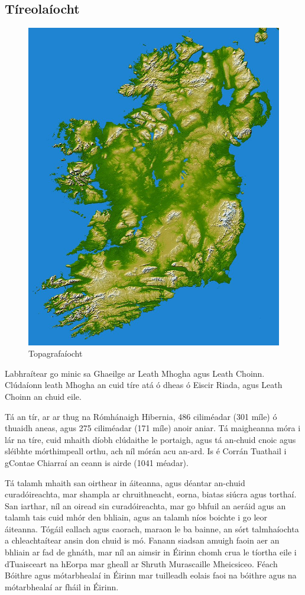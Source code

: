 \documentclass[a4paper,12pt]{article}
\theoremstyle{plain} %
\theoremstyle{definition} %
\theoremstyle{remark} %
\begin{document}
\subsection{Tíreolaíocht}

\begin{figure}
\includegraphics[width=\linewidth]{Topography_Ireland.jpg}
\caption{Topagrafaíocht}
\end{figure}Labhraítear go minic sa Ghaeilge ar Leath Mhogha agus Leath Choinn. Clúdaíonn leath Mhogha an cuid tíre atá ó dheas ó Eiscir Riada, agus Leath Choinn an chuid eile.

Tá an tír, ar ar thug na Rómhánaigh Hibernia, 486 ciliméadar (301 míle) ó thuaidh aneas, agus 275 ciliméadar (171 míle) anoir aniar. Tá maigheanna móra i lár na tíre, cuid mhaith díobh clúdaithe le portaigh, agus tá an-chuid cnoic agus sléibhte mórthimpeall orthu, ach níl mórán acu an-ard. Is é Corrán Tuathail i gContae Chiarraí an ceann is airde (1041 méadar).

Tá talamh mhaith san oirthear in áiteanna, agus déantar an-chuid curadóireachta, mar shampla ar chruithneacht, eorna, biatas siúcra agus torthaí. San iarthar, níl an oiread sin curadóireachta, mar go bhfuil an aeráid agus an talamh tais cuid mhór den bhliain, agus an talamh níos boichte i go leor áiteanna. Tógáil eallach agus caorach, maraon le ba bainne, an sórt talmhaíochta a chleachtaítear ansin don chuid is mó. Fanann siadsan amuigh faoin aer an bhliain ar fad de ghnáth, mar níl an aimsir in Éirinn chomh crua le tíortha eile i dTuaisceart na hEorpa mar gheall ar Shruth Murascaille Mheicsiceo. Féach Bóithre agus mótarbhealaí in Éirinn mar tuilleadh eolais faoi na bóithre agus na mótarbhealaí ar fháil in Éirinn.
\end{document}
